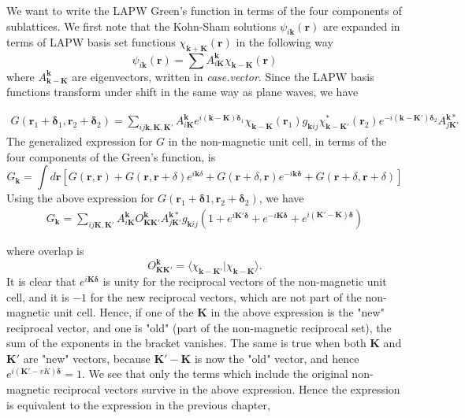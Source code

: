 \documentclass[aps,prb,floatfix,epsfig,twocolumn,showpacs,preprintnumbers]{revtex4}
\renewcommand{\vr}{{\mathbf{r}}}
\newcommand{\vk}{{\mathbf{k}}}
\newcommand{\vdelta}{{\mathbf{\delta}}}
\newcommand{\vK}{{\mathbf{K}}}
\begin{document}
We want to write the LAPW Green's function in terms of the four
components of sublattices. We first note that the Kohn-Sham solutions $\psi_{i\vk}(\vr)$
are expanded in terms of LAPW basis set functions
$\chi_{\vk+\vK}(\vr)$ in the following way
\begin{equation}
\psi_{i\vk}(\vr) = \sum A^\vk_{i\vK}\chi_{\vk-\vK}(\vr)
\end{equation}
where $A^\vk_{\vk-\vK}$ are eigenvectors, written in \textit{case.vector}.
Since the LAPW basis functions transform
under shift in the same way as plane waves, we have
\begin{widetext}
\begin{eqnarray}
 G(\vr_1+\vdelta_1,\vr_2+\vdelta_2) = 
 \sum_{ij\vk,\vK,\vK'}
 A^\vk_{i\vK} e^{i(\vk-\vK)\vdelta_1}\chi_{\vk-\vK}(\vr_1) g_{\vk ij}
 \chi^*_{\vk-\vK'}(\vr_2)e^{-i(\vk-\vK')\vdelta_2} A^{\vk *}_{j\vK'}
\end{eqnarray}
The generalized expression for $G$ in the non-magnetic unit cell, in terms of the four components of
the Green's function, is
\begin{equation}
G_\vk = \int d\vr \left[ G(\vr,\vr) + G(\vr,\vr+\delta)e^{i\vk\delta}+G(\vr+\delta,\vr)e^{-i\vk\vdelta}+G(\vr+\delta,\vr+\delta)\right]  
\end{equation}
Using the above expression for $G(\vr_1+\vdelta1,\vr_2+\vdelta_2)$, we
have
\begin{eqnarray}
 G_\vk = 
 \sum_{ij\vK,\vK'}
 A^\vk_{i\vK} O^\vk_{\vK\vK'}A^{\vk *}_{j\vK'} g_{\vk ij}
(1+e^{i\vK'\vdelta}+e^{-i\vK\vdelta}+e^{i(\vK'-\vK)\vdelta}) 
\end{eqnarray}
\end{widetext}
where overlap is
\begin{equation}
O^\vk_{\vK\vK'} = \langle \chi_{\vk-\vK'}|\chi_{\vk-\vK}\rangle.
\end{equation}
It is clear that $e^{i \vK\vdelta}$ is unity for the reciprocal
vectors of the non-magnetic unit cell, and it is $-1$ for the new
reciprocal vectors, which are not part of the non-magnetic unit
cell. Hence, if one of the $\vK$ in the above expression is the "new"
reciprocal vector, and one is "old" (part of the non-magnetic
reciprocal set), the sum of the exponents in the bracket vanishes. The
same is true when both $\vK$ and $\vK'$ are "new" vectors, because
$\vK'-\vK$ is now the "old" vector, and hence $e^{i(\vK'-vK)\vdelta}=1$.
We see that only the terms which include the original non-magnetic
reciprocal vectors survive in the above expression. Hence the
expression is equivalent to the expression in the previous chapter,
\end{document}
